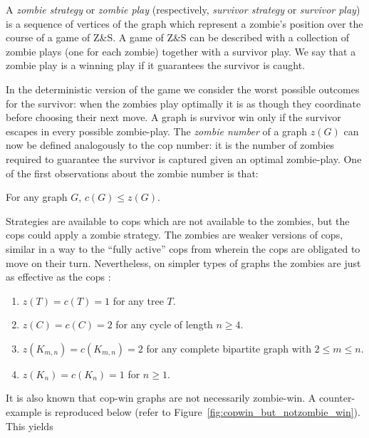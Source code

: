 A \textit{zombie strategy} or \textit{zombie play} (respectively, \textit{survivor strategy} or \textit{survivor play}) is a sequence of vertices of the graph which represent a zombie's position over the course of a game of Z\&S. A game of Z\&S can be described with a collection of zombie plays (one for each zombie) together with a survivor play. We say that a zombie play is a winning play if it guarantees the survivor is caught.

In the deterministic version of the game we consider the worst possible outcomes for the survivor: when the zombies play optimally it is as though they coordinate before choosing their next move. A graph is survivor win only if the survivor escapes in every possible zombie-play.
The \textit{zombie number} of a graph $z(G)$ can now be defined analogously to the cop number: it is the number of zombies required to guarantee the survivor is captured given an optimal zombie-play.
One of the first observations \cite{fitzpatrick2016deterministic} about the zombie number is that:

\begin{lemma}
For any graph $G$, $c(G) \leq z(G)$.
\end{lemma}

Strategies are available to cops which are not available to the zombies, but the cops could apply a zombie strategy. The zombies are weaker versions of cops, similar in a way to the ``fully active'' cops from \cite{gromovikov2018fully} wherein the cops are obligated to move on their turn. Nevertheless, on simpler types of graphs the zombies are just as effective as the cops \cite{fitzpatrick2016deterministic}:

\begin{observation}
  \begin{enumerate}
    \item $z(T) = c(T) = 1$ for any tree $T$.
    \item $z(C) = c(C) = 2$ for any cycle of length $n \geq 4$.
    \item $z(K_{m,n}) = c(K_{m,n}) = 2$ for any complete bipartite graph with $2 \leq m \leq n$.
    \item $z(K_n) = c(K_n) = 1$ for $n \geq 1$.
  \end{enumerate}
\end{observation}

It is also known \cite{fitzpatrick2016deterministic} that cop-win graphs are not necessarily zombie-win. A counter-example  is reproduced below (refer to Figure~\ref{fig:copwin_but_notzombie_win}). This yields

